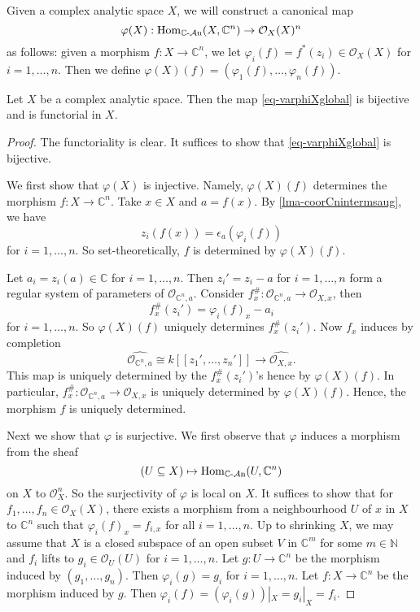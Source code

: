 Given a complex analytic space $X$, we will construct a canonical map
\begin{equation}\label{eq-varphiXglobal}
    \varphi(X):\operatorname{Hom}_{\mathbb{C}\text{-}\mathcal{A}\mathrm{n}}(X,\mathbb{C}^n)\rightarrow \mathcal{O}_X(X)^n
\end{equation}
as follows: given a morphism $f:X\rightarrow \mathbb{C}^n$, we let $\varphi_i(f)=f^*(z_i)\in \mathcal{O}_X(X)$ for $i=1,\ldots,n$. Then we define $\varphi(X)(f)=(\varphi_1(f),\ldots,\varphi_n(f))$.


\begin{theorem}\label{thm-hCnidentification}
    Let $X$ be a complex analytic space. Then the map \eqref{eq-varphiXglobal} is bijective and is functorial in $X$.
\end{theorem}
\begin{proof}
    The functoriality is clear. It suffices to show that \eqref{eq-varphiXglobal} is bijective.

    We first show that $\varphi(X)$ is injective. Namely, $\varphi(X)(f)$ determines the morphism $f:X\rightarrow \mathbb{C}^n$. Take $x\in X$ and $a=f(x)$. By \cref{lma-coorCnintermsaug}, we have
    \[
        z_i(f(x))=\epsilon_{a}(\varphi_i(f))  
    \]
    for $i=1,\ldots,n$. So set-theoretically, $f$ is determined by $\varphi(X)(f)$.

    Let $a_i=z_i(a)\in \mathbb{C}$ for $i=1,\ldots,n$. Then $z_i'=z_i-a$ for $i=1,\ldots,n$ form a regular system of parameters of $\mathcal{O}_{\mathbb{C}^n,a}$. Consider $f_x^{\#}:\mathcal{O}_{\mathbb{C}^n,a}\rightarrow \mathcal{O}_{X,x}$, then
    \[
        f_x^{\#}(z_i')=\varphi_i(f)_x-a_i  
    \]
    for $i=1,\ldots,n$. So $\varphi(X)(f)$ uniquely determines $f_x^{\#}(z_i')$. Now $f_x$ induces by completion
    \[
        \widehat{\mathcal{O}_{\mathbb{C}^n,a}}\cong k[[z_1',\ldots,z_n']]\rightarrow \widehat{\mathcal{O}_{X,x}}.  
    \]
    This map is uniquely determined by the $f_x^{\#}(z_i')$'s hence by $\varphi(X)(f)$. In particular, $f_x^{\#}:\mathcal{O}_{\mathbb{C}^n,a}\rightarrow \mathcal{O}_{X,x}$ is uniquely determined by $\varphi(X)(f)$. Hence, the morphism $f$ is uniquely determined.

    Next we show that $\varphi$ is surjective. We first observe that $\varphi$ induces a morphism from the sheaf
    \[
          (U\subseteq X)\mapsto \operatorname{Hom}_{\mathbb{C}\text{-}\mathcal{A}\mathrm{n}}(U,\mathbb{C}^n)
    \]
    on $X$ to $\mathcal{O}_X^n$. So the surjectivity of $\varphi$ is local on $X$. It suffices to show that for $f_1,\ldots,f_n\in \mathcal{O}_X(X)$, there exists a morphism from a neighbourhood $U$ of $x$ in $X$ to $\mathbb{C}^n$ such that $\varphi_i(f)_x=f_{i,x}$ for all $i=1,\ldots,n$. Up to shrinking $X$, we may assume that $X$ is a closed subspace of an open subset $V$ in $\mathbb{C}^m$ for some $m\in \mathbb{N}$ and $f_i$ lifts to $g_i\in \mathcal{O}_U(U)$ for $i=1,\ldots,n$. Let $g:U\rightarrow \mathbb{C}^n$ be the morphism induced by $(g_1,\ldots,g_n)$. Then $\varphi_i(g)=g_i$ for $i=1,\ldots,n$. Let $f:X\rightarrow \mathbb{C}^n$ be the morphism induced by $g$. Then $\varphi_i(f)=(\varphi_i(g))|_X=g_i|_X=f_i$.
\end{proof}

